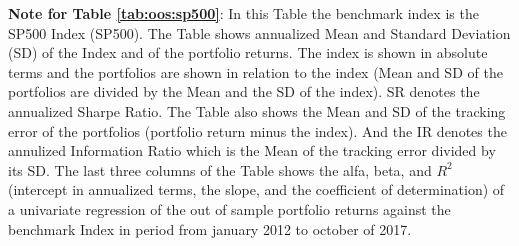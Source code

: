 \documentclass[preprint,authoryear,review,12pt]{elsarticle}
\begin{document}
\begin{singlespace}
{\footnotesize
\textbf{Note for Table \ref{tab:oos:sp500}}:
In this Table the benchmark index is the SP500 Index (SP500).
The Table shows annualized Mean and Standard Deviation (SD) of the Index and of the portfolio returns.
The index is shown in absolute terms and the portfolios are shown in relation to the index (Mean and SD of the portfolios are divided by the Mean and the SD of the index).
SR denotes the annualized Sharpe Ratio.
The Table also shows the Mean and SD of the tracking error of the portfolios (portfolio return minus the index).
And the IR denotes the annulized Information Ratio which is the Mean of the tracking error divided by its SD.
The last three columns of the Table shows the alfa, beta, and $R^2$ (intercept in annualized terms, the slope, and the coefficient of determination) of a univariate regression of the out of sample portfolio returns against the benchmark Index in period from january 2012 to october of 2017.}
\end{singlespace}

\clearpage
\end{document}
